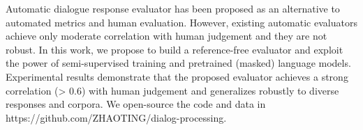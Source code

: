 Automatic dialogue response evaluator has been proposed as an alternative to automated metrics and human evaluation. However, existing automatic evaluators achieve only moderate correlation with human judgement and they are not robust. In this work, we propose to build a reference-free evaluator and exploit the power of semi-supervised training and pretrained (masked) language models. Experimental results demonstrate that the proposed evaluator achieves a strong correlation (> 0.6) with human judgement and generalizes robustly to diverse responses and corpora. We open-source the code and data in https://github.com/ZHAOTING/dialog-processing.
